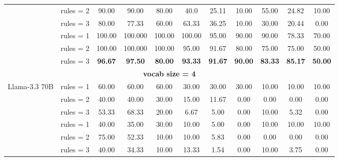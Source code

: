 \begin{table*}[t]
{\begin{tabular}{l c ccc ccc ccc}
           & rules = 2 & 90.00 & 90.00 & 80.00 & 40.0 & 25.11 & 10.00 & 55.00 & 24.82 & 10.00\\
           & \cellcolor{SeaGreen3!30}rules = 3 & \cellcolor{SeaGreen3!30}80.00 & \cellcolor{SeaGreen3!30}77.33 & \cellcolor{SeaGreen3!30}60.00 & \cellcolor{SeaGreen3!30}63.33 & \cellcolor{SeaGreen3!30}36.25 & \cellcolor{SeaGreen3!30}10.00 & \cellcolor{SeaGreen3!30}30.00 & \cellcolor{SeaGreen3!30}20.44 & \cellcolor{SeaGreen3!30}0.00\\
           \hdashline
           \multirow{3}{*}{o3-mini} & rules = 1 & 100.00 & 100.000 & 100.00 & 100.00 & 95.00 & 90.00 & 90.00 & 78.33 & 70.00\\
           & rules = 2 & 100.00 & 100.000 & 100.00 & 95.00 & 91.67 & 80.00 & 75.00 & 75.00 & 50.00\\
           & \cellcolor{SeaGreen3!30}rules = 3 & \cellcolor{SeaGreen3!30}\textbf{96.67} & \cellcolor{SeaGreen3!30}\textbf{97.50} & \cellcolor{SeaGreen3!30}\textbf{80.00} & \cellcolor{SeaGreen3!30}\textbf{93.33} & \cellcolor{SeaGreen3!30}\textbf{91.67} & \cellcolor{SeaGreen3!30}\textbf{90.00} & \cellcolor{SeaGreen3!30}\textbf{83.33} & \cellcolor{SeaGreen3!30}\textbf{85.17} & \cellcolor{SeaGreen3!30}\textbf{50.00}\\
           \midrule 
           \multicolumn{11}{c}{\textbf{vocab size = 4}} \\
         \midrule
           \multirow{3}{*}{Llama-3.3 70B} & rules = 1 & 60.00 & 60.00 & 60.00 & 30.00 & 30.00 & 30.00 & 10.00 & 10.00 & 10.00\\
           & rules = 2 & 40.00 & 40.00 & 30.00 & 15.00 & 11.67 & 0.00 & 0.00 & 0.00 & 0.00\\
           & \cellcolor{SeaGreen3!50}rules = 3 & \cellcolor{SeaGreen3!50}53.33 & \cellcolor{SeaGreen3!50}68.33 & \cellcolor{SeaGreen3!50}20.00 & \cellcolor{SeaGreen3!50}6.67 & \cellcolor{SeaGreen3!50}5.00 & \cellcolor{SeaGreen3!50}0.00 & \cellcolor{SeaGreen3!50}10.00 & \cellcolor{SeaGreen3!50}5.32 & \cellcolor{SeaGreen3!50}0.00\\
           \hdashline
           \multirow{3}{*}{Llama-3.1 405B} & rules = 1 & 40.00 & 35.00 & 30.00 & 10.00 & 5.00 & 0.00 & 10.00 & 10.00 & 10.00\\
           & rules = 2 & 75.00 & 52.33 & 10.00 & 10.00 & 5.83 & 0.00 & 0.00 & 0.00 & 0.00\\
           & \cellcolor{SeaGreen3!50}rules = 3 & \cellcolor{SeaGreen3!50}40.00 & \cellcolor{SeaGreen3!50}34.33 & \cellcolor{SeaGreen3!50}10.00 & \cellcolor{SeaGreen3!50}13.33 & \cellcolor{SeaGreen3!50}1.54 & \cellcolor{SeaGreen3!50}0.00 & \cellcolor{SeaGreen3!50}10.00 & \cellcolor{SeaGreen3!50}3.75 & \cellcolor{SeaGreen3!50}0.00\\

\end{tabular}}
\end{table*}
